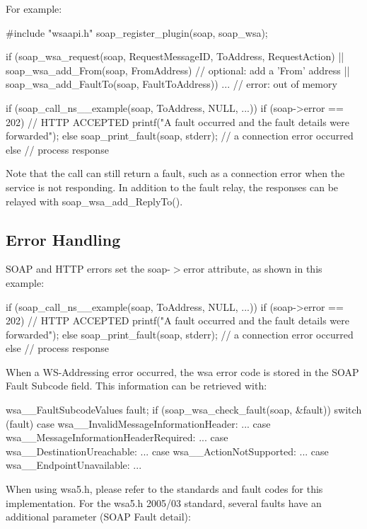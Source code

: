 For example:


\begin{DoxyCode}
#include "wsaapi.h"
soap_register_plugin(soap, soap_wsa);

if (soap_wsa_request(soap, RequestMessageID, ToAddress, RequestAction)
 || soap_wsa_add_From(soap, FromAddress) // optional: add a 'From' address
 || soap_wsa_add_FaultTo(soap, FaultToAddress))
  ... // error: out of memory

if (soap_call_ns__example(soap, ToAddress, NULL, ...))
{
  if (soap->error == 202) // HTTP ACCEPTED
    printf("A fault occurred and the fault details were forwarded\n");
  else
    soap_print_fault(soap, stderr); // a connection error occurred
}
else
  // process response 
\end{DoxyCode}


Note that the call can still return a fault, such as a connection error when the service is not responding. In addition to the fault relay, the responses can be relayed with soap\_\-wsa\_\-add\_\-ReplyTo().\hypertarget{wsa__0_wsa_2_4}{}\subsection{Error Handling}\label{wsa__0_wsa_2_4}
SOAP and HTTP errors set the soap-\/$>$error attribute, as shown in this example:


\begin{DoxyCode}
if (soap_call_ns__example(soap, ToAddress, NULL, ...))
{
  if (soap->error == 202) // HTTP ACCEPTED
    printf("A fault occurred and the fault details were forwarded\n");
  else
    soap_print_fault(soap, stderr); // a connection error occurred
}
else
  // process response 
\end{DoxyCode}


When a WS-\/Addressing error occurred, the wsa error code is stored in the SOAP Fault Subcode field. This information can be retrieved with:


\begin{DoxyCode}
wsa__FaultSubcodeValues fault;
if (soap_wsa_check_fault(soap, &fault))
{
  switch (fault)
  {
    case wsa__InvalidMessageInformationHeader: ...
    case wsa__MessageInformationHeaderRequired: ...
    case wsa__DestinationUreachable: ...
    case wsa__ActionNotSupported: ...
    case wsa__EndpointUnavailable: ...
  }
}
\end{DoxyCode}


When using wsa5.h, please refer to the standards and fault codes for this implementation. For the wsa5.h 2005/03 standard, several faults have an additional parameter (SOAP Fault detail):


